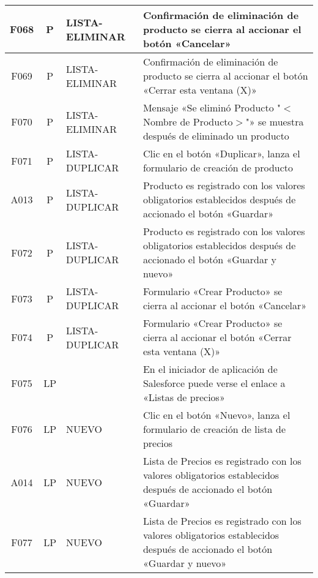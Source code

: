 \begin{landscape}
{\begin{longtable}[htb]{|c|c|p{3.8cm}|p{15.2cm}|}
\scriptsize{F068} & \scriptsize{P} & \scriptsize{LISTA-ELIMINAR} & \scriptsize{Confirmación de eliminación de producto se cierra al accionar el botón «Cancelar»} \\ \hline
\scriptsize{F069} & \scriptsize{P} & \scriptsize{LISTA-ELIMINAR} & \scriptsize{Confirmación de eliminación de producto se cierra al accionar el botón «Cerrar esta ventana (X)»} \\ \hline
\scriptsize{F070} & \scriptsize{P} & \scriptsize{LISTA-ELIMINAR} & \scriptsize{Mensaje «Se eliminó Producto "$<$Nombre de Producto$>$"» se muestra después de eliminado un producto} \\ \hline
\scriptsize{F071} & \scriptsize{P} & \scriptsize{LISTA-DUPLICAR} & \scriptsize{Clic en el botón «Duplicar», lanza el formulario de creación de producto} \\ \hline
\scriptsize{A013} & \scriptsize{P} & \scriptsize{LISTA-DUPLICAR} & \scriptsize{Producto es registrado con los valores obligatorios establecidos después de accionado el botón «Guardar»} \\ \hline
\scriptsize{F072} & \scriptsize{P} & \scriptsize{LISTA-DUPLICAR} & \scriptsize{Producto es registrado con los valores obligatorios establecidos después de accionado el botón «Guardar y nuevo»} \\ \hline
\scriptsize{F073} & \scriptsize{P} & \scriptsize{LISTA-DUPLICAR} & \scriptsize{Formulario «Crear Producto» se cierra al accionar el botón «Cancelar»} \\ \hline
\scriptsize{F074} & \scriptsize{P} & \scriptsize{LISTA-DUPLICAR} & \scriptsize{Formulario «Crear Producto» se cierra al accionar el botón «Cerrar esta ventana (X)»} \\ \hline
\scriptsize{F075} & \scriptsize{LP} & & \scriptsize{En el iniciador de aplicación de Salesforce puede verse el enlace a «Listas de precios»} \\ \hline
\scriptsize{F076} & \scriptsize{LP} & \scriptsize{NUEVO} & \scriptsize{Clic en el botón «Nuevo», lanza el formulario de creación de lista de precios} \\ \hline
\scriptsize{A014} & \scriptsize{LP} & \scriptsize{NUEVO} & \scriptsize{Lista de Precios es registrado con los valores obligatorios establecidos después de accionado el botón «Guardar»} \\ \hline
\scriptsize{F077} & \scriptsize{LP} & \scriptsize{NUEVO} & \scriptsize{Lista de Precios es registrado con los valores obligatorios establecidos después de accionado el botón «Guardar y nuevo»} \\ \hline

\end{longtable}}
\end{landscape}
